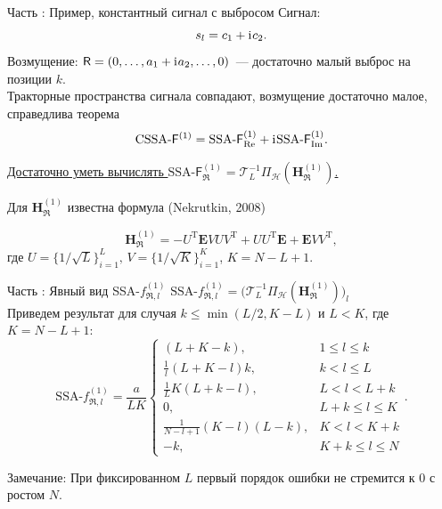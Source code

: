 \documentclass[10pt, ucs, notheorems, handout]{beamer}
\newcommand{\tX}[1]{\mathsf{#1}}
\newcommand{\iu}{\mathrm{i}\mkern1mu}
\newcommand{\RomanNumeralCaps}[1]
{\MakeUppercase{\romannumeral #1}}
\begin{document}
\begin{frame}{Часть \RomanNumeralCaps{2}: Пример, константный сигнал с выбросом}
\alert{Сигнал:}
$$s_l = c_1 + \iu c_2.$$
\alert{Возмущение:} $\tX{R} = (0, \ldots, a_1 + \iu a_2, \ldots, 0)$~--- достаточно малый выброс на позиции $k$.\\
\vspace{1em}
Тракторные пространства сигнала совпадают, возмущение достаточно малое, справедлива теорема $$\text{CSSA-}\tX{F}^{(1)} = \text{SSA-}\tX{F}^{(1)}_{\Re} + \iu\text{SSA-}\tX{F}^{(1)}_{\Im}.$$

\vspace{1em}
\underline{Достаточно уметь вычислять $\text{SSA-}\tX{F}^{(1)}_{\Re} = \mathcal{T}_L^{-1} \Pi_{\mathcal{H}}(\mathbf{H}^{(1)}_{\Re})$.}

\vspace{1em}
Для $\mathbf{H}^{(1)}_{\Re}$ известна формула (Nekrutkin, 2008)

$$\mathbf{H}^{(1)}_{\Re} = -U^{\mathrm{T}} \mathbf{E} V U V^{\mathrm{T}} + U U^{\mathrm{T}} \mathbf{E} + \mathbf{E} V V^{\mathrm{T}},$$
где $U = \{1/\sqrt{L}\}^{L}_{i = 1},\, V = \{1/\sqrt{K}\}^{K}_{i = 1}$, $K = N - L + 1$.
\end{frame}

\begin{frame}{Часть \RomanNumeralCaps{2}: Явный вид SSA-$f^{(1)}_{\Re,l}$}
$\text{SSA-}f^{(1)}_{\Re, l} = \big( \mathcal{T}_L^{-1} \Pi_{\mathcal{H}}(\mathbf{H}^{(1)}_{\Re})\big)_{l}$\\
\vspace{1em}
    Приведем результат для случая $k \leq \min(L/2, K - L)$ и $L < K$, где $K=N-L+1$:
$$\text{SSA-}f^{(1)}_{\Re, l} = \frac{a}{{LK}}
\begin{cases}
	(L + K - k), & \text{$1 \leq l \leq k$}\\
	\frac{1}{l}(L + K - l)k, & \text{$k < l \leq L$}\\
	\frac{1}{L}K(L + k - l), &\text{$L < l < L + k$}\\
	0, &\text{$L + k \leq l \leq K$}\\
	\frac{1}{N - l + 1}(K - l)(L - k), &\text{$K < l < K + k$}\\
	-k, &\text{$K + k \leq l \leq N $}
\end{cases}.$$

\alert{Замечание:} При фиксированном $L$ первый порядок ошибки не стремится к $0$ с ростом $N$.
\end{frame}
\end{document}
